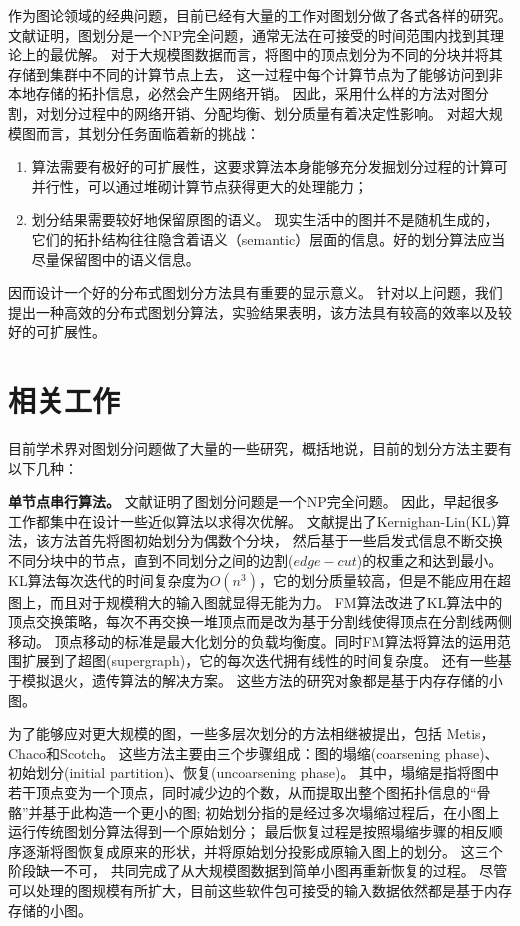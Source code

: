 \documentclass[master]{njuthesis}
\begin{document}
作为图论领域的经典问题，目前已经有大量的工作对图划分做了各式各样的研究。 
文献\cite{garey1974somenp}证明，图划分是一个NP完全问题，通常无法在可接受的时间范围内找到其理论上的最优解。
对于大规模图数据而言，将图中的顶点划分为不同的分块并将其存储到集群中不同的计算节点上去，
这一过程中每个计算节点为了能够访问到非本地存储的拓扑信息，必然会产生网络开销。
因此，采用什么样的方法对图分割，对划分过程中的网络开销、分配均衡、划分质量有着决定性影响。
对超大规模图而言，其划分任务面临着新的挑战：
\begin{enumerate}
\item 算法需要有极好的可扩展性，这要求算法本身能够充分发掘划分过程的计算可并行性，可以通过堆砌计算节点获得更大的处理能力；

\item 划分结果需要较好地保留原图的语义。
现实生活中的图并不是随机生成的，它们的拓扑结构往往隐含着语义（semantic）层面的信息。好的划分算法应当尽量保留图中的语义信息。
\end{enumerate}

因而设计一个好的分布式图划分方法具有重要的显示意义。
针对以上问题，我们提出一种高效的分布式图划分算法，实验结果表明，该方法具有较高的效率以及较好的可扩展性。

\section{相关工作}
目前学术界对图划分问题做了大量的一些研究，概括地说，目前的划分方法主要有以下几种：

\textbf{单节点串行算法。 } 文献\cite{garey1974somenp}证明了图划分问题是一个NP完全问题。 
因此，早起很多工作都集中在设计一些近似算法以求得次优解。
文献\cite{kernighan1970efficient}提出了Kernighan-Lin(KL)算法，该方法首先将图初始划分为偶数个分块，
然后基于一些启发式信息不断交换不同分块中的节点，直到不同划分之间的边割($edge-cut$)的权重之和达到最小。
KL算法每次迭代的时间复杂度为$O(n^3)$，它的划分质量较高，但是不能应用在超图上，而且对于规模稍大的输入图就显得无能为力。
FM算法\cite{fiduccia1988linear}改进了KL算法中的顶点交换策略，每次不再交换一堆顶点而是改为基于分割线使得顶点在分割线两侧移动。
顶点移动的标准是最大化划分的负载均衡度。同时FM算法将算法的运用范围扩展到了超图(supergraph)，它的每次迭代拥有线性的时间复杂度。
还有一些基于模拟退火\cite{johnson1989optimization}，遗传算法\cite{bui1996genetic}的解决方案。
这些方法的研究对象都是基于内存存储的小图。

为了能够应对更大规模的图，一些多层次划分的方法相继被提出，包括 Metis\cite{Karypis95metis}，Chaco\cite{leland1995chaco}和Scotch\cite{pellegrini1996scotch}。
这些方法主要由三个步骤组成：图的塌缩(coarsening phase)、初始划分(initial partition)、恢复(uncoarsening phase)。
其中，塌缩是指将图中若干顶点变为一个顶点，同时减少边的个数，从而提取出整个图拓扑信息的“骨骼”并基于此构造一个更小的图; 
初始划分指的是经过多次塌缩过程后，在小图上运行传统图划分算法得到一个原始划分；
最后恢复过程是按照塌缩步骤的相反顺序逐渐将图恢复成原来的形状，并将原始划分投影成原输入图上的划分。
这三个阶段缺一不可， 共同完成了从大规模图数据到简单小图再重新恢复的过程。
尽管可以处理的图规模有所扩大，目前这些软件包可接受的输入数据依然都是基于内存存储的小图。
\end{document}
